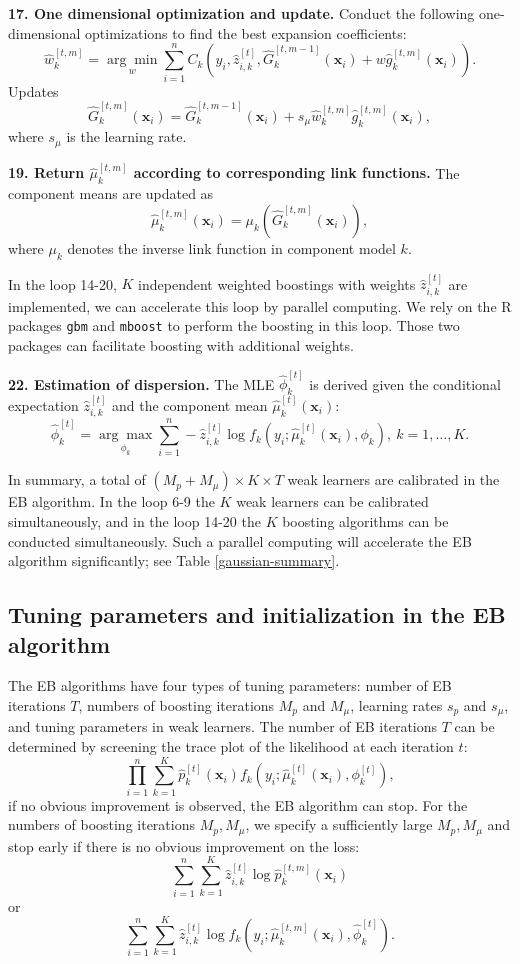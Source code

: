 \documentclass[11pt]{article}
\numberwithin{equation}{section}
\def\bx{\boldsymbol{x}}
\begin{document}
{\bf 17. One dimensional optimization and update.}	
	Conduct the following one-dimensional optimizations to find the best expansion coefficients:
		$$\hat{w}_{k}^{[t,m]}=\underset{w}{\arg\min}\sum_{i=1}^n C_{k}(y_i,\hat{z}_{i,k}^{[t]},\hat{G}_k^{[t,m-1]}(\bx_i)+w\hat{g}_k^{[t,m]}(\bx_i)).$$
		Updates
		$$\hat{G}_k^{[t,m]}(\bx_i)=\hat{G}_k^{[t,m-1]}(\bx_i)+s_\mu\hat{w}_{k}^{[t,m]}\hat{g}_{k}^{[t,m]}(\bx_i),$$
		where $s_\mu$ is the learning rate.

{\bf 19. Return $\hat{\mu}_k^{[t,m]}$ according to corresponding link functions.} The component means are updated as
		$$\hat{\mu}_k^{[t,m]}(\bx_i)=\mu_k(\hat{G}_k^{[t,m]}(\bx_i)),$$
		where $\mu_k$ denotes the inverse link function in component model $k$.

In the loop 14-20, $K$ independent weighted boostings with weights $\hat{z}_{i,k}^{[t]}$ are implemented, we can accelerate this loop  by parallel computing.
We rely on the R packages {\tt gbm} and {\tt mboost} to perform the boosting in this loop. 
Those two packages can facilitate boosting with additional weights.


{\bf 22. Estimation of dispersion.} 
The MLE $\hat{\phi}_k^{[t]}$ is derived given the conditional expectation $\hat{z}_{i,k}^{[t]}$ and the component mean $\hat{\mu}_k^{[t]}(\bx_i)$:
\begin{equation}
		\hat{\phi}_k^{[t]}=\underset{\phi_k}{\arg\max} \sum_{i=1}^n-\hat{z}_{i,k}^{[t]}\log f_k(y_i;\hat{\mu}_k^{[t]}(\bx_i),\phi_k), ~ k=1,\ldots,K.
\end{equation}

In summary, a total of $(M_p+M_\mu)\times K\times T$ weak learners are calibrated in the EB algorithm. In the loop 6-9  the $K$ weak learners can be calibrated simultaneously, and in the loop 14-20 the $K$ boosting algorithms can be conducted simultaneously. Such a parallel computing will accelerate the EB algorithm significantly; see Table \ref{gaussian-summary}.

\subsection{Tuning parameters and initialization in the EB algorithm}
The EB algorithms have four types of tuning parameters: number of EB iterations $T$, numbers of boosting iterations $M_p$ and $M_\mu$, learning rates $s_p$ and $s_\mu$, and tuning parameters in weak learners. 
The number of EB iterations $T$ can be determined by screening the trace plot of the likelihood at each iteration $t$:
$$\prod_{i=1}^{n}\sum_{k=1}^K\hat{p}_k^{[t]}(\bx_i)f_k(y_i;\hat{\mu}_k^{[t]}(\bx_i),\phi_k^{[t]}),$$
if no obvious improvement is observed, the EB algorithm can stop.
For the numbers of boosting iterations  {$M_p,M_\mu$}, we specify a sufficiently large $M_p,M_\mu$ and stop early if there is no obvious improvement on the loss:
$$\sum_{i=1}^n\sum_{k=1}^K \hat{z}_{i,k}^{[t]}\log \hat{p}_k^{[t,m]}(\bx_i)$$
or 
$$\sum_{i=1}^n\sum_{k=1}^K \hat{z}^{[t]}_{i,k}\log f_k\left(y_i;\hat{\mu}_k^{[t,m]}\left(\bx_i\right),\hat{\phi}_k^{[t]}\right).$$
\end{document}
